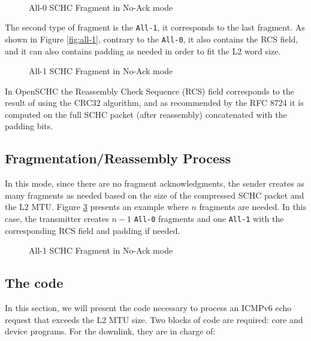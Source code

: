 ~

\begin{figure}[!ht] 
    \centering 
    
    \caption{All-0 SCHC Fragment in No-Ack mode} 
    \label{fig-all-0} 
\end{figure} 

The second type of fragment is the \texttt{All-1}, it corresponds to the last fragment. As shown in Figure \ref{fig:all-1}, contrary to the \texttt{All-0}, it also contains the RCS field, and it can also contains padding as needed in order to fit the L2 word size.

\begin{figure}[!ht] 
    \centering 
    
    \caption{All-1 SCHC Fragment in No-Ack mode} 
    \label{fig-all-1} 
\end{figure} 
   
In OpenSCHC the Reassembly Check Sequence (RCS) field corresponds to the result of using the CRC32 algorithm, and as recommended by the RFC 8724 it is computed on the full SCHC packet (after reassembly) concatenated with the padding bits.

\subsection{Fragmentation/Reassembly Process}

In this mode, since there are no fragment acknowledgments, the sender creates as many fragments as needed based on the size of the compressed SCHC packet and the L2 MTU.
Figure \ref{fig-NoAck} presents an example where $n$ fragments are needed. 
In this case, the transmitter creates $n-1$ \texttt{All-0} fragments and one \texttt{All-1} with the corresponding RCS field and padding if needed.

\begin{figure}[!ht] 
    \centering 
    
    \caption{All-1 SCHC Fragment in No-Ack mode} 
    \label{fig-NoAck} 
\end{figure} 

\subsection{The code}

In this section, we will present the code necessary to process an ICMPv6 echo request that exceeds the L2 MTU size. 
Two blocks of code are required: core and device programs. 
For the downlink, they are in charge of: 

